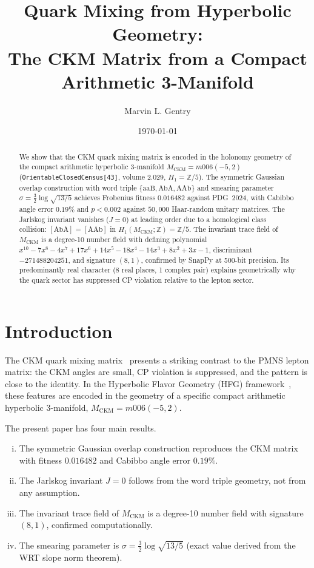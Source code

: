 \documentclass[11pt,a4paper]{article}
\theoremstyle{remark}
\newcommand{\MCKM}{M_{\mathrm{CKM}}}
\newcommand{\Zfive}{\mathbb{Z}/5}
\newcommand{\ZZ}{\mathbb{Z}}
\begin{document}
\title{Quark Mixing from Hyperbolic Geometry:\\
The CKM Matrix from a Compact Arithmetic 3-Manifold}

\author[1]{Marvin L. Gentry}
\date{\today}
\maketitle

\begin{abstract}
We show that the CKM quark mixing matrix is encoded in the holonomy
geometry of the compact arithmetic hyperbolic 3-manifold
$\MCKM = m006(-5,2)$ (\texttt{OrientableClosedCensus[43]},
volume $2.029$, $H_1=\Zfive$).
The symmetric Gaussian overlap construction with word triple
$\{\mathrm{aaB},\mathrm{AbA},\mathrm{AAb}\}$ and smearing parameter
$\sigma = \frac{3}{2}\log\sqrt{13/5}$ achieves Frobenius fitness
$0.016482$ against PDG~2024, with Cabibbo angle error $0.19\%$
and $p<0.002$ against $50{,}000$ Haar-random unitary matrices.
The Jarlskog invariant vanishes ($J=0$) at leading order due to a
homological class collision: $[\mathrm{AbA}]=[\mathrm{AAb}]$ in
$H_1(\MCKM;\ZZ)=\Zfive$.
The invariant trace field of $\MCKM$ is a degree-10 number field
with defining polynomial
$x^{10}-7x^8-4x^7+17x^6+14x^5-18x^4-14x^3+8x^2+3x-1$,
discriminant $-271488204251$, and signature $(8,1)$,
confirmed by SnapPy at 500-bit precision.
Its predominantly real character (8 real places, 1 complex pair)
explains geometrically why the quark sector has suppressed CP
violation relative to the lepton sector.
\end{abstract}


\section{Introduction}
\label{sec:intro}

The CKM quark mixing matrix~\cite{CKM} presents a striking
contrast to the PMNS lepton matrix: the CKM angles are small,
CP violation is suppressed, and the pattern is close to the identity.
In the Hyperbolic Flavor Geometry (HFG) framework~\cite{Gentry:Unified},
these features are encoded in the geometry of a specific compact
arithmetic hyperbolic 3-manifold, $\MCKM = m006(-5,2)$.

The present paper has four main results.
\begin{enumerate}[(i)]
\item The symmetric Gaussian overlap construction reproduces the CKM
  matrix with fitness $0.016482$ and Cabibbo angle error $0.19\%$.
\item The Jarlskog invariant $J=0$ follows from the word triple
  geometry, not from any assumption.
\item The invariant trace field of $\MCKM$ is a degree-10 number
  field with signature $(8,1)$, confirmed computationally.
\item The smearing parameter is $\sigma=\frac{3}{2}\log\sqrt{13/5}$
  (exact value derived from the WRT slope norm theorem).
\end{enumerate}
\end{document}
